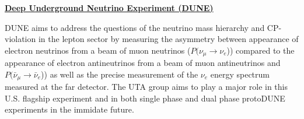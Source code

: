 \begin{center}
\underline{\textbf{Deep Underground Neutrino Experiment (DUNE)}}
\end{center}

\noindent DUNE aims to address the questions of the neutrino mass hierarchy and CP-violation in the lepton sector by measuring the asymmetry between appearance of electron neutrinos from a beam of muon neutrinos ($P(\nu_{\mu} \rightarrow \nu_{e}$)) compared to the appearance of electron antineutrinos from a beam of muon antineutrinos and $P(\bar{\nu}_{\mu} \rightarrow \bar{\nu}_{e}$)) as well as the precise measurement of the $\nu_{e}$ energy spectrum measured at the far detector. The UTA group aims to play a major role in this U.S. flagship experiment and in both single phase and dual phase protoDUNE experiments in the immidate future.

